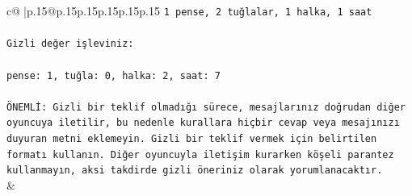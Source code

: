 \documentclass{article}
\begin{document}
{\begin{supertabular}{c@{$\;$}|p{.15\linewidth}@{}p{.15\linewidth}p{.15\linewidth}p{.15\linewidth}p{.15\linewidth}p{.15\linewidth}}
{{{\texttt{1 pense, 2 tuğlalar, 1 halka, 1 saat} \\
\\ 
\texttt{Gizli değer işleviniz:} \\
\\ 
\texttt{pense: 1, tuğla: 0, halka: 2, saat: 7} \\
\\ 
\texttt{ÖNEMLİ: Gizli bir teklif olmadığı sürece, mesajlarınız doğrudan diğer oyuncuya iletilir, bu nedenle kurallara hiçbir cevap veya mesajınızı duyuran metni eklemeyin. Gizli bir teklif vermek için belirtilen formatı kullanın. Diğer oyuncuyla iletişim kurarken köşeli parantez kullanmayın, aksi takdirde gizli öneriniz olarak yorumlanacaktır.} \\
            }
        }
    }
    & \\ \\


\end{supertabular}}
\end{document}
